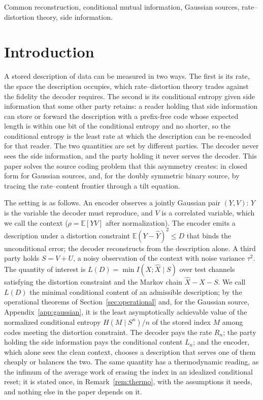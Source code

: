 \documentclass[11pt,onecolumn]{IEEEtran}
\newcommand{\E}{\mathbb{E}}
\newcommand{\hX}{\widehat{X}}
\newcommand{\hY}{\widehat{Y}}
\begin{document}
\begin{IEEEkeywords}
Common reconstruction, conditional mutual information, Gaussian sources,
rate--distortion theory, side information.
\end{IEEEkeywords}

\section{Introduction}
\label{sec:intro}

A stored description of data can be measured in two ways. The first is
its rate, the space the description occupies, which rate--distortion
theory trades against the fidelity the decoder requires. The second is
its conditional entropy given side information that some other party
retains: a reader holding that side information can store or forward the
description with a prefix-free code whose expected length is within one
bit of the conditional entropy and no shorter, so the conditional entropy
is the least rate at which the description can be re-encoded for that
reader. The two quantities are set by different parties. The decoder
never sees the side information, and the party holding it never serves
the decoder. This paper solves the source coding problem that this
asymmetry creates: in closed form for Gaussian sources, and, for the
doubly symmetric binary source, by tracing the rate--content frontier
through a tilt equation.

The setting is as follows. An encoder observes a jointly Gaussian pair
$(Y,V)$: $Y$ is the variable the decoder must reproduce, and $V$ is a
correlated variable, which we call the context ($\rho=\E[YV]$ after
normalization). The encoder emits a description under a distortion constraint
$\E(Y-\hY)^2\le D$ that binds the unconditional error; the decoder
reconstructs from the description alone. A third
party holds $S=V+U$, a noisy observation of the context with noise variance
$\tau^2$. The quantity of interest is
$L(D)=\min I(X;\hX\mid S)$ over test channels satisfying the distortion
constraint and the Markov chain $\hX-X-S$. We call $L(D)$ the minimal
conditional content of an admissible description; by the operational
theorems of Section~\ref{sec:operational} and, for the Gaussian source,
Appendix~\ref{app:gaussian}, it is the least asymptotically achievable
value of the normalized conditional entropy $H(M\mid S^n)/n$ of the stored
index $M$ among codes meeting the distortion constraint. The decoder pays
the rate $R_n$; the party holding the side information pays the
conditional content $L_n$; and the encoder, which alone sees the clean
context, chooses a description that serves one of them cheaply or
balances the two. The same quantity has a thermodynamic reading, as the
infimum of the average work of erasing the index in an idealized
conditional reset; it is stated once, in Remark~\ref{rem:thermo}, with
the assumptions it needs, and nothing else in the paper depends on it.
\end{document}
